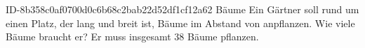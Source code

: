 \begin{exercise}
      {ID-8b358c0af0700d0c6b68c2bab22d52df1cf12a62}
      {Bäume}
  \ifproblem\problem
    Ein Gärtner soll rund um einen Platz, der  lang und 
    breit ist, Bäume im Abstand von  anpflanzen. Wie viele Bäume
    braucht er?
  \fi
  \ifoutcome\outcome
    Er muss insgesamt \num{38} Bäume pflanzen.
  \fi
\end{exercise}
